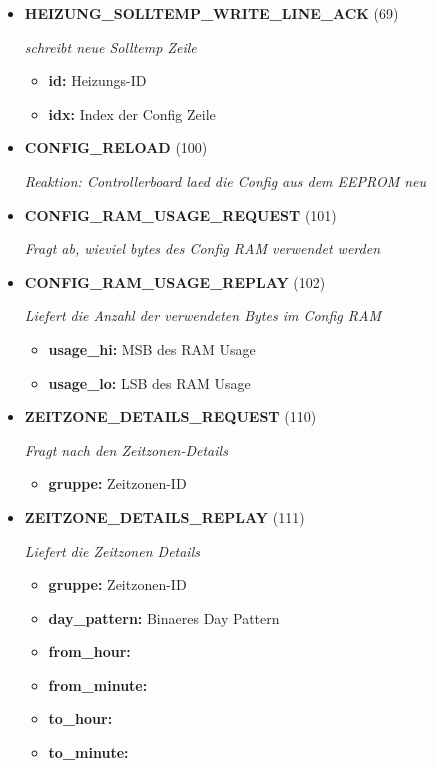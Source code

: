 \begin{itemize}
\item \textbf{HEIZUNG\_SOLLTEMP\_WRITE\_LINE\_ACK} (69)

\textit{schreibt neue Solltemp Zeile}

\small
\begin{itemize}
		
\item \textbf{id:} Heizungs-ID
\item \textbf{idx:} Index der Config Zeile
\end{itemize}
\normalsize
	
\item \textbf{CONFIG\_RELOAD} (100)

\textit{Reaktion: Controllerboard laed die Config aus dem EEPROM neu}

\item \textbf{CONFIG\_RAM\_USAGE\_REQUEST} (101)

\textit{Fragt ab, wieviel bytes des Config RAM verwendet werden}

\item \textbf{CONFIG\_RAM\_USAGE\_REPLAY} (102)

\textit{Liefert die Anzahl der verwendeten Bytes im Config RAM}

\small
\begin{itemize}
		
\item \textbf{usage\_hi:} MSB des RAM Usage
\item \textbf{usage\_lo:} LSB des RAM Usage
\end{itemize}
\normalsize
	
\item \textbf{ZEITZONE\_DETAILS\_REQUEST} (110)

\textit{Fragt nach den Zeitzonen-Details}

\small
\begin{itemize}
		
\item \textbf{gruppe:} Zeitzonen-ID
\end{itemize}
\normalsize
	
\item \textbf{ZEITZONE\_DETAILS\_REPLAY} (111)

\textit{Liefert die Zeitzonen Details}

\small
\begin{itemize}
		
\item \textbf{gruppe:} Zeitzonen-ID
\item \textbf{day\_pattern:} Binaeres Day Pattern
\item \textbf{from\_hour:} 
\item \textbf{from\_minute:} 
\item \textbf{to\_hour:} 
\item \textbf{to\_minute:} 
\end{itemize}
\normalsize
	

\end{itemize}
